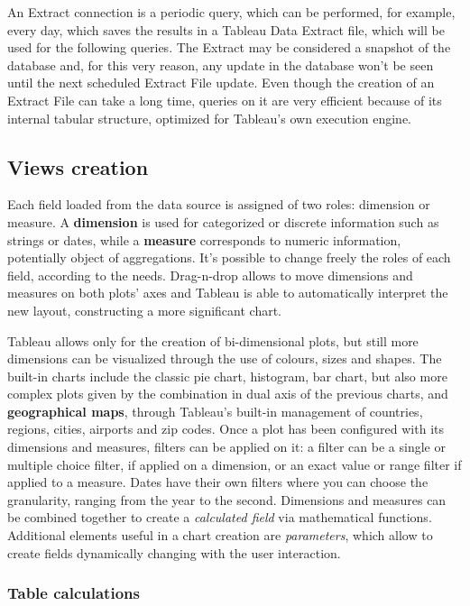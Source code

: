 An Extract connection is a periodic query, which can be performed, for example, every day, which saves the results in a Tableau Data Extract file, which will be used for the following queries. The Extract may be considered a snapshot of the database and, for this very reason, any update in the database won't be seen until the next scheduled Extract File update. Even though the creation of an Extract File can take a long time, queries on it are very efficient because of its internal tabular structure, optimized for Tableau's own execution engine.

\subsection{Views creation}

Each field loaded from the data source is assigned of two roles: dimension or measure. A \textbf{dimension} is used for categorized or discrete information such as strings or dates, while a \textbf{measure} corresponds to numeric information, potentially object of aggregations. It's possible to change freely the roles of each field, according to the needs. Drag-n-drop allows to move dimensions and measures on both plots' axes and Tableau is able to automatically interpret the new layout, constructing a more significant chart.

Tableau allows only for the creation of bi-dimensional plots, but still more dimensions can be visualized through the use of colours, sizes and shapes.
The built-in charts include the classic pie chart, histogram, bar chart, but also more complex plots given by the combination in dual axis of the previous charts, and \textbf{geographical maps}, through Tableau's built-in management of countries, regions, cities, airports and zip codes. 
Once a plot has been configured with its dimensions and measures, filters can be applied on it: a filter can be a single or multiple choice filter, if applied on a dimension, or an exact value or range filter if applied to a measure. Dates have their own filters where you can choose the granularity, ranging from the year to the second.
Dimensions and measures can be combined together to create a \textit{calculated field} via mathematical functions.
Additional elements useful in a chart creation are \textit{parameters}, which allow to create fields dynamically changing with the user interaction.

\subsubsection{Table calculations}

